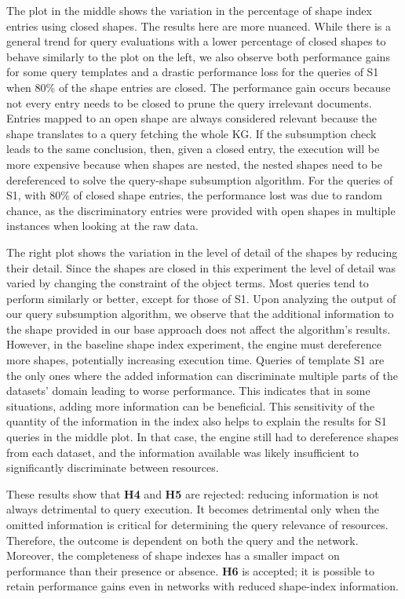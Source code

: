 The plot in the middle shows the variation in the percentage of shape index entries using closed shapes.
The results here are more nuanced.
While there is a general trend for query evaluations with a lower percentage of closed shapes to behave similarly to the plot on the left, we also observe both performance gains for some query templates and a drastic performance loss for the queries of S1 when 80\% of the shape entries are closed.
The performance gain occurs because not every entry needs to be closed to prune the query irrelevant documents.
Entries mapped to an open shape are always considered relevant because the shape translates to a query fetching the whole \ac{KG}.
If the subsumption check leads to the same conclusion, then, given a closed entry, the execution will be more expensive because
when shapes are nested, the nested shapes need to be dereferenced to solve the query-shape subsumption algorithm.
For the queries of S1, with 80\% of closed shape entries, the performance lost was due to random chance, as the discriminatory entries were provided with open shapes in multiple instances when looking at the raw data.

The right plot shows the variation in the level of detail of the shapes by reducing their detail.
Since the shapes are closed in this experiment the level of detail was varied by changing the constraint of the object terms.
Most queries tend to perform similarly or better, except for those of S1.
Upon analyzing the output of our query subsumption algorithm, we observe that the additional information to the shape provided in our base approach does not affect the algorithm's results.
However, in the baseline shape index experiment, the engine must dereference more shapes, potentially increasing execution time.
Queries of template S1 are the only ones where the added information can discriminate multiple parts of the datasets' domain leading to worse performance.
This indicates that in some situations, adding more information can be beneficial.
This sensitivity of the quantity of the information in the index also helps to explain the results for S1 queries in the middle plot.
In that case, the engine still had to dereference shapes from each dataset, and the information available was likely insufficient to significantly discriminate between resources.

These results show that \textbf{H4} and \textbf{H5} are rejected: reducing information is not always detrimental to query execution.
It becomes detrimental only when the omitted information is critical for determining the query relevance of resources.
Therefore, the outcome is dependent on both the query and the network.
Moreover, the completeness of shape indexes has a smaller impact on performance than their presence or absence.
\textbf{H6} is accepted; it is possible to retain performance gains even in networks with reduced shape-index information.

